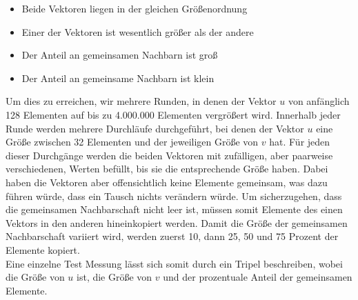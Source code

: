 \begin{itemize}
	\item Beide Vektoren liegen in der gleichen Größenordnung
	
	\item Einer der Vektoren ist wesentlich größer als der andere
	
	\item Der Anteil an gemeinsamen Nachbarn ist groß
	
	\item Der Anteil an gemeinsame Nachbarn  ist klein
\end{itemize}
Um dies zu erreichen,  wir mehrere Runden, in denen der Vektor $u$ von anfänglich 128
Elementen auf bis zu 4.000.000 Elementen vergrößert wird. Innerhalb jeder Runde werden mehrere Durchläufe 
durchgeführt, bei denen der Vektor $u$ eine Größe zwischen 32 Elementen und der jeweiligen Größe von $v$ hat.
Für jeden dieser Durchgänge werden die beiden Vektoren mit zufälligen, aber paarweise verschiedenen,
Werten befüllt, bis sie die entsprechende Größe haben. 
Dabei haben die Vektoren aber offensichtlich keine Elemente gemeinsam, was dazu führen würde, dass ein \gc{} 
Tausch nichts verändern würde. Um sicherzugehen,
dass die gemeinsamen Nachbarschaft nicht leer ist, müssen somit Elemente des einen Vektors 
in den anderen hineinkopiert werden. Damit die Größe der gemeinsamen Nachbarschaft
variiert wird, werden zuerst 10, dann 25, 50 und 75 Prozent der Elemente kopiert. 
\\
Eine einzelne Test Messung lässt sich somit durch ein Tripel \fett{(\la, \sm, \fr)} beschreiben, wobei
\fett{\la} die Größe von $u$ ist, \fett{\sm} die 
Größe von $v$ und \fett{\fr} der prozentuale Anteil der gemeinsamen Elemente.






